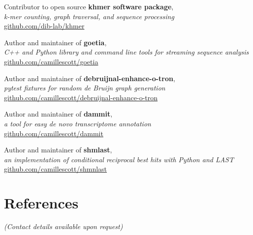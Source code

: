 \documentclass[margin,12pt]{camille_resume}
\begin{document}
\begin{resume}
\begin{list1}
\item[] Contributor to open source {\bf khmer software package},\\ 
{\em k-mer counting, graph traversal, and sequence processing}\\
\hfill \href{https://github.com/ged-lab/khmer/}{github.com/dib-lab/khmer}\\

\item[] Author and maintainer of {\bf goetia},\\
    {\em C++ and Python library and command line tools for streaming sequence analysis}\\
\hfill \href{https://github.com/camillescott/goetia}{github.com/camillescott/goetia}\\

\item[] Author and maintainer of {\bf debruijnal-enhance-o-tron},\\
{\em pytest fixtures for random de Bruijn graph generation}\\
\hfill \href{https://github.com/camillescott/debruijnal-enhance-o-tron}{github.com/camillescott/debruijnal-enhance-o-tron}\\

\item[] Author and maintainer of {\bf dammit},\\
{\em a tool for easy de novo transcriptome annotation}\\
\hfill \href{https://github.com/camillescott/dammit}{github.com/camillescott/dammit}\\

\item[] Author and maintainer of {\bf shmlast},\\
{\em an implementation of conditional reciprocal best hits with Python and LAST}\\
\hfill \href{https://github.com/camillescott/shmlast}{github.com/camillescott/shmnlast}\\

\end{list1}


\section{\mysidestyle References}

{\em (Contact details available upon request)}

\end{resume}
\end{document}
